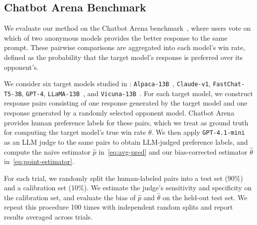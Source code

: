 \subsection{Chatbot Arena Benchmark}

We evaluate our method on the Chatbot Arena benchmark~\citep{chiang2024chatbot}, where users vote on which of two anonymous models provides the better response to the same prompt. These pairwise comparisons are aggregated into each model’s win rate, defined as the probability that the target model’s response is preferred over its opponent’s.

We consider six target models studied in \citet{zheng2023judging}: \texttt{Alpaca-13B}~\citep{alpaca}, \texttt{Claude-v1}, \texttt{FastChat-T5-3B}, \texttt{GPT-4}, \texttt{LLaMA-13B}~\citep{touvron2023llama}, and \texttt{Vicuna-13B}~\citep{vicuna2023}. For each target model, we construct response pairs consisting of one response generated by the target model and one response generated by a randomly selected opponent model. Chatbot Arena provides human preference labels for these pairs, which we treat as ground truth for computing the target model’s true win rate $\theta$. We then apply \texttt{GPT-4.1-mini} as an LLM judge to the same pairs to obtain LLM-judged preference labels, and compute the naive estimator $\hat{p}$ in~\eqref{eq:avg-pred} and our bias-corrected estimator $\hat{\theta}$ in~\eqref{eq:point-estimator}.

For each trial, we randomly split the human-labeled pairs into a test set (90\%) and a calibration set (10\%). We estimate the judge’s sensitivity and specificity on the calibration set, and evaluate the bias of $\hat{p}$ and $\hat{\theta}$ on the held-out test set. We repeat this procedure 100 times with independent random splits and report results averaged across trials.



